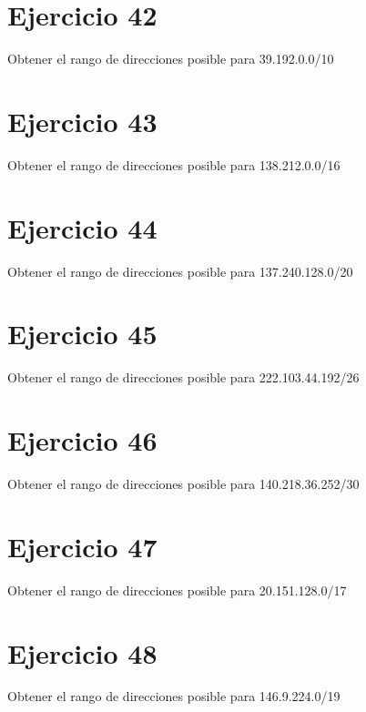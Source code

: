 \documentclass[letterpaper,10pt,spanish]{sphinxmanual}
\begin{document}
\section{Ejercicio 42}
\label{\detokenize{t2_integracion_elementos/ejercicios_subredes_ipv4/rangos_direcciones:ejercicio-42}}
\sphinxAtStartPar
Obtener el rango de direcciones posible para 39.192.0.0/10


\section{Ejercicio 43}
\label{\detokenize{t2_integracion_elementos/ejercicios_subredes_ipv4/rangos_direcciones:ejercicio-43}}
\sphinxAtStartPar
Obtener el rango de direcciones posible para 138.212.0.0/16


\section{Ejercicio 44}
\label{\detokenize{t2_integracion_elementos/ejercicios_subredes_ipv4/rangos_direcciones:ejercicio-44}}
\sphinxAtStartPar
Obtener el rango de direcciones posible para 137.240.128.0/20


\section{Ejercicio 45}
\label{\detokenize{t2_integracion_elementos/ejercicios_subredes_ipv4/rangos_direcciones:ejercicio-45}}
\sphinxAtStartPar
Obtener el rango de direcciones posible para 222.103.44.192/26


\section{Ejercicio 46}
\label{\detokenize{t2_integracion_elementos/ejercicios_subredes_ipv4/rangos_direcciones:ejercicio-46}}
\sphinxAtStartPar
Obtener el rango de direcciones posible para 140.218.36.252/30


\section{Ejercicio 47}
\label{\detokenize{t2_integracion_elementos/ejercicios_subredes_ipv4/rangos_direcciones:ejercicio-47}}
\sphinxAtStartPar
Obtener el rango de direcciones posible para 20.151.128.0/17


\section{Ejercicio 48}
\label{\detokenize{t2_integracion_elementos/ejercicios_subredes_ipv4/rangos_direcciones:ejercicio-48}}
\sphinxAtStartPar
Obtener el rango de direcciones posible para 146.9.224.0/19
\end{document}

